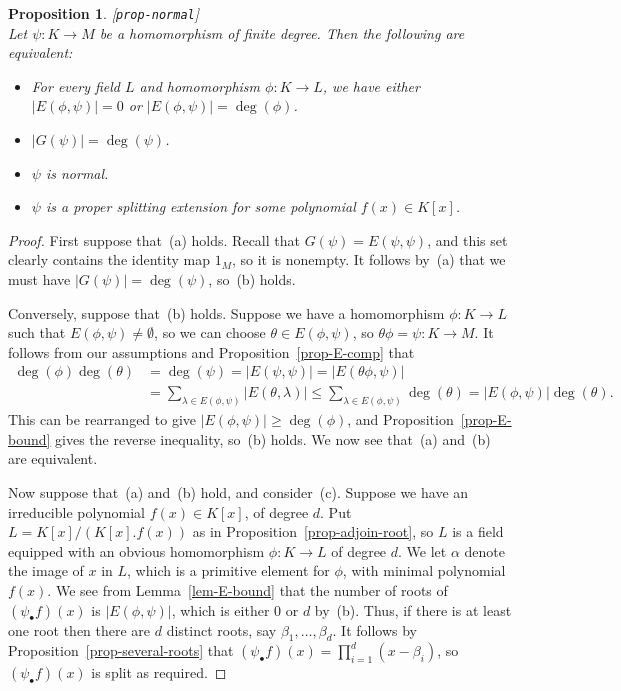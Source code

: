 \documentclass{amsart}
\newcommand{\lbl}[1]{\label{#1}\textup{[\texttt{#1}]}\ \\}
\newcommand{\lbl}{\label}
\newcommand{\al}        {\alpha}
\newcommand{\bt}        {\beta}
\newcommand{\tht}       {\theta}
\newcommand{\lm}        {\lambda}
\renewcommand{\:}{\colon}
\newtheorem{proposition}[theorem]{Proposition}
\theoremstyle{definition}
\begin{document}
\begin{proposition}\lbl{prop-normal}
 Let $\psi\:K\to M$ be a homomorphism of finite degree.  Then the
 following are equivalent:
 \begin{itemize}
  \item[(a)] For every field $L$ and homomorphism $\phi\:K\to L$, we
   have either $|E(\phi,\psi)|=0$ or $|E(\phi,\psi)|=\deg(\phi)$.
  \item[(b)] $|G(\psi)|=\deg(\psi)$.
  \item[(c)] $\psi$ is normal.
  \item[(d)] $\psi$ is a proper splitting extension for some
   polynomial $f(x)\in K[x]$.
 \end{itemize}
\end{proposition}
\begin{proof}
 First suppose that~(a) holds.  Recall that $G(\psi)=E(\psi,\psi)$,
 and this set clearly contains the identity map $1_M$, so it is
 nonempty.  It follows by~(a) that we must have
 $|G(\psi)|=\deg(\psi)$, so~(b) holds.

 Conversely, suppose that~(b) holds.  Suppose we have a homomorphism
 $\phi\:K\to L$ such that $E(\phi,\psi)\neq\emptyset$, so we can
 choose $\tht\in E(\phi,\psi)$, so $\tht\phi=\psi\:K\to M$.  It
 follows from our assumptions and Proposition~\ref{prop-E-comp} that 
 \begin{align*}
   \deg(\phi)\deg(\tht) 
    &= \deg(\psi) =|E(\psi,\psi)| = |E(\tht\phi,\psi)| \\
    &= \sum_{\lm\in E(\phi,\psi)}|E(\tht,\lm)|
     \leq \sum_{\lm\in E(\phi,\psi)}\deg(\tht) = 
     |E(\phi,\psi)|\deg(\tht).
 \end{align*}
 This can be rearranged to give $|E(\phi,\psi)|\geq\deg(\phi)$, and
 Proposition~\ref{prop-E-bound} gives the reverse inequality, so~(b)
 holds.  We now see that~(a) and~(b) are equivalent.

 Now suppose that~(a) and~(b) hold, and consider~(c).  Suppose we have
 an irreducible polynomial $f(x)\in K[x]$, of degree $d$.  Put
 $L=K[x]/(K[x].f(x))$ as in Proposition~\ref{prop-adjoin-root}, so $L$
 is a field equipped with an obvious homomorphism $\phi\:K\to L$ of
 degree $d$.  We let $\al$ denote the image of $x$ in $L$, which is a
 primitive element for $\phi$, with minimal polynomial $f(x)$.  We see
 from Lemma~\ref{lem-E-bound} that the number of roots of
 $(\psi_\bullet f)(x)$ is $|E(\phi,\psi)|$, which is either $0$ or $d$
 by~(b).  Thus, if there is at least one root then there are $d$
 distinct roots, say $\bt_1,\dotsc,\bt_d$.  It follows by
 Proposition~\ref{prop-several-roots} that
 $(\psi_\bullet f)(x)=\prod_{i=1}^d(x-\bt_i)$, so
 $(\psi_\bullet f)(x)$ is split as required.


\end{proof}
\end{document}
